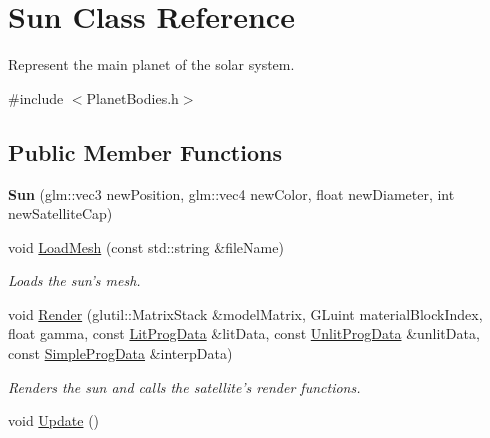 \hypertarget{class_sun}{\section{Sun Class Reference}
\label{class_sun}
}


Represent the main planet of the solar system.  




{\ttfamily \#include $<$Planet\-Bodies.\-h$>$}

\subsection*{Public Member Functions}
\begin{DoxyCompactItemize}
\item 
\hypertarget{class_sun_afa36350139c104164631de3beb9ac48c}{{\bfseries Sun} (glm\-::vec3 new\-Position, glm\-::vec4 new\-Color, float new\-Diameter, int new\-Satellite\-Cap)}\label{class_sun_afa36350139c104164631de3beb9ac48c}

\item 
\hypertarget{class_sun_a3f3680c0b94268b85cc06e7eff70cb07}{void \hyperlink{class_sun_a3f3680c0b94268b85cc06e7eff70cb07}{Load\-Mesh} (const std\-::string \&file\-Name)}\label{class_sun_a3f3680c0b94268b85cc06e7eff70cb07}

\begin{DoxyCompactList}\small\item\em Loads the sun's mesh. \end{DoxyCompactList}\item 
void \hyperlink{class_sun_a736012a1d04686497506fe25636bcdbb}{Render} (glutil\-::\-Matrix\-Stack \&model\-Matrix, G\-Luint material\-Block\-Index, float gamma, const \hyperlink{struct_lit_prog_data}{Lit\-Prog\-Data} \&lit\-Data, const \hyperlink{struct_unlit_prog_data}{Unlit\-Prog\-Data} \&unlit\-Data, const \hyperlink{struct_simple_prog_data}{Simple\-Prog\-Data} \&interp\-Data)
\begin{DoxyCompactList}\small\item\em Renders the sun and calls the satellite's render functions. \end{DoxyCompactList}\item 
\hypertarget{class_sun_af3bfaeceea178c017478d25afa0dff07}{void \hyperlink{class_sun_af3bfaeceea178c017478d25afa0dff07}{Update} ()}\label{class_sun_af3bfaeceea178c017478d25afa0dff07}


\end{DoxyCompactItemize}
